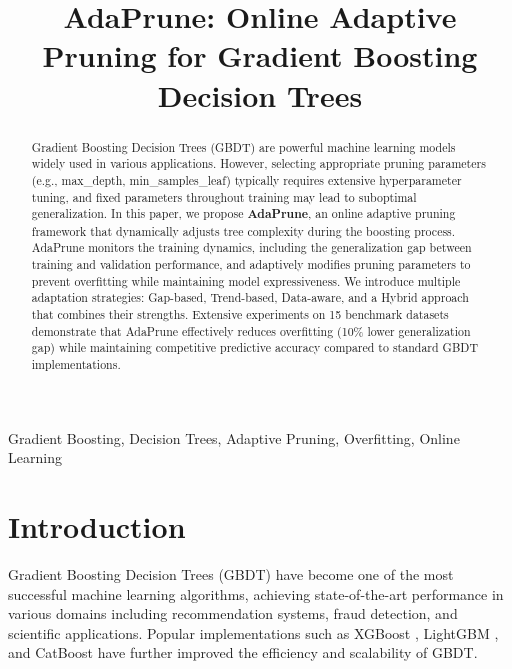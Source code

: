 \documentclass[conference]{IEEEtran}
\begin{document}
\title{AdaPrune: Online Adaptive Pruning for Gradient Boosting Decision Trees}

\author{
}

\maketitle

\begin{abstract}
Gradient Boosting Decision Trees (GBDT) are powerful machine learning models widely used in various applications. However, selecting appropriate pruning parameters (e.g., max\_depth, min\_samples\_leaf) typically requires extensive hyperparameter tuning, and fixed parameters throughout training may lead to suboptimal generalization. In this paper, we propose \textbf{AdaPrune}, an online adaptive pruning framework that dynamically adjusts tree complexity during the boosting process. AdaPrune monitors the training dynamics, including the generalization gap between training and validation performance, and adaptively modifies pruning parameters to prevent overfitting while maintaining model expressiveness. We introduce multiple adaptation strategies:  Gap-based, Trend-based, Data-aware, and a Hybrid approach that combines their strengths.  Extensive experiments on 15 benchmark datasets demonstrate that AdaPrune effectively reduces overfitting (10\% lower generalization gap) while maintaining competitive predictive accuracy compared to standard GBDT implementations. 
\end{abstract}

\begin{IEEEkeywords}
Gradient Boosting, Decision Trees, Adaptive Pruning, Overfitting, Online Learning
\end{IEEEkeywords}

\section{Introduction}

Gradient Boosting Decision Trees (GBDT) \cite{friedman2001greedy} have become one of the most successful machine learning algorithms, achieving state-of-the-art performance in various domains including recommendation systems, fraud detection, and scientific applications. Popular implementations such as XGBoost \cite{chen2016xgboost}, LightGBM \cite{ke2017lightgbm}, and CatBoost \cite{prokhorenkova2018catboost} have further improved the efficiency and scalability of GBDT. 
\end{document}
